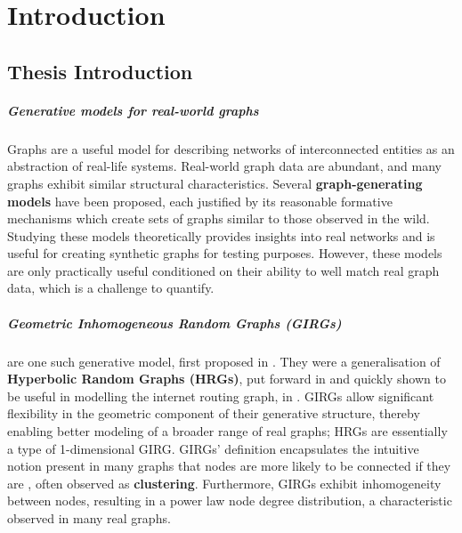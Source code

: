 \chapter{Introduction}
\label{chap:introduction}
\section{Thesis Introduction}
\paragraph{Generative models for real-world graphs} Graphs are a useful model for describing networks of interconnected entities as an abstraction of real-life systems. Real-world graph data are abundant, and many graphs exhibit similar structural characteristics. Several \textbf{graph-generating models} have been proposed, each justified by its reasonable formative mechanisms which create sets of graphs similar to those observed in the wild. Studying these models theoretically provides insights into real networks and is useful for creating synthetic graphs for testing purposes. However, these models are only practically useful conditioned on their ability to well match real graph data, which is a challenge to quantify.

\paragraph{Geometric Inhomogeneous Random Graphs (GIRGs)} are one such generative model, first proposed in \cite{bringmann2016average}. They were a generalisation of \textbf{Hyperbolic Random Graphs (HRGs)}, put forward in \cite{krioukov2010hyperbolic} and quickly shown to be useful in modelling the internet routing graph, in \cite{boguna2010sustaining}. GIRGs allow significant flexibility in the geometric component of their generative structure, thereby enabling better modeling of a broader range of real graphs; HRGs are essentially a type of 1-dimensional GIRG. GIRGs' definition encapsulates the intuitive notion present in many graphs that nodes are more likely to be connected if they are , often observed as \textbf{clustering}. Furthermore, GIRGs exhibit inhomogeneity between nodes, resulting in a power law node degree distribution, a characteristic observed in many real graphs.

